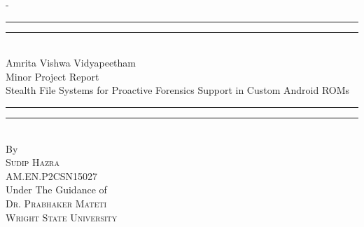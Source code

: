 %
%
% 
%
%
\begin{titlingpage}
\begin{SingleSpace}
\calccentering{\unitlength} 
\begin{adjustwidth*}{\unitlength}{-\unitlength}
\vspace*{10mm}
\begin{center}
\rule[0.5ex]{\linewidth}{2pt}\vspace*{-\baselineskip}\vspace*{3.2pt}
\rule[0.5ex]{\linewidth}{1pt}\\[\baselineskip]
{\HUGE Amrita Vishwa Vidyapeetham}\\[4mm]
{\HUGE Minor Project Report }\\[4mm]
{\HUGE Stealth File Systems for Proactive Forensics Support in Custom Android ROMs }\\[4mm]

\rule[0.5ex]{\linewidth}{1pt}\vspace*{-\baselineskip}\vspace{3.2pt}
\rule[0.5ex]{\linewidth}{2pt}\\
\vspace{6.5mm}
{\large By}\\
\vspace{6.5mm}
{\large\textsc{Sudip Hazra}}\\
{\large\textsc{AM.EN.P2CSN15027}}\\
\vspace{6.5mm}
{\large Under The Guidance of}\\
\vspace{6.5mm}
{\large\textsc{Dr. Prabhaker Mateti}}\\
{\large\textsc{Wright State University}}\\



\end{center}
\end{adjustwidth*}
\end{SingleSpace}
\end{titlingpage}
